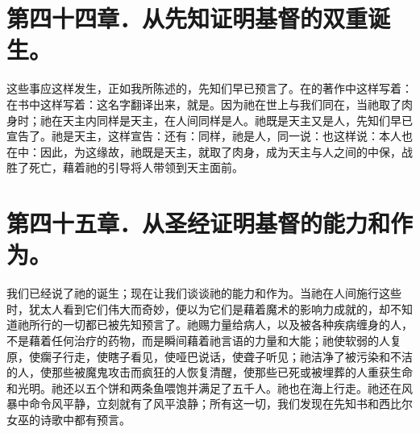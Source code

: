 
\section{第四十四章．从先知证明基督的双重诞生。}

这些事应这样发生，正如我所陈述的，先知们早已预言了。在的著作中这样写着：在书中这样写着：这名字翻译出来，就是。因为祂在世上与我们同在，当祂取了肉身时；祂在天主内同样是天主，在人间同样是人。祂既是天主又是人，先知们早已宣告了。祂是天主，这样宣告：还有：同样，祂是人，同一说：也这样说：本人也在中：因此，为这缘故，祂既是天主，就取了肉身，成为天主与人之间的中保，战胜了死亡，藉着祂的引导将人带领到天主面前。\par


\section{第四十五章．从圣经证明基督的能力和作为。}

我们已经说了祂的诞生；现在让我们谈谈祂的能力和作为。当祂在人间施行这些时，犹太人看到它们伟大而奇妙，便以为它们是藉着魔术的影响力成就的，却不知道祂所行的一切都已被先知预言了。祂赐力量给病人，以及被各种疾病缠身的人，不是藉着任何治疗的药物，而是瞬间藉着祂言语的力量和大能；祂使软弱的人复原，使瘸子行走，使瞎子看见，使哑巴说话，使聋子听见；祂洁净了被污染和不洁的人，使那些被魔鬼攻击而疯狂的人恢复清醒，使那些已死或被埋葬的人重获生命和光明。祂还以五个饼和两条鱼喂饱并满足了五千人。祂也在海上行走。祂还在风暴中命令风平静，立刻就有了风平浪静；所有这一切，我们发现在先知书和西比尔女巫的诗歌中都有预言。\par

